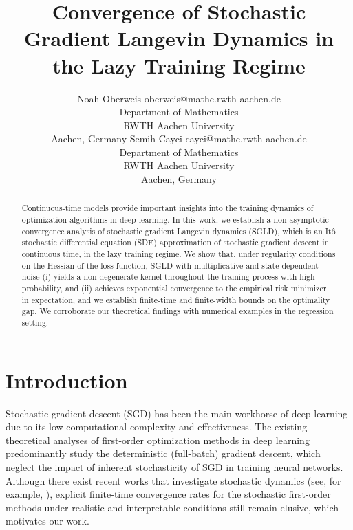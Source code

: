 \documentclass[10pt]{article} %
\title{Convergence of Stochastic Gradient Langevin Dynamics in the Lazy Training Regime}
\author{\name Noah Oberweis \email oberweis@mathc.rwth-aachen.de \\
      \addr Department of Mathematics\\
      RWTH Aachen University\\
      Aachen, Germany
      \AND
      \name Semih Cayci \email cayci@mathc.rwth-aachen.de \\
      \addr Department of Mathematics\\
      RWTH Aachen University\\
      Aachen, Germany
      }
\begin{document}
\maketitle

\begin{abstract}
Continuous-time models provide important insights into the training dynamics of optimization algorithms in deep learning. In this work, we establish a non-asymptotic convergence analysis of stochastic gradient Langevin dynamics (SGLD), which is an Itô stochastic differential equation (SDE) approximation of stochastic gradient descent in continuous time, in the lazy training regime. We show that, under regularity conditions on the Hessian of the loss function, SGLD with multiplicative and state-dependent noise (i) yields a non-degenerate kernel throughout the training process with high probability, and (ii) achieves exponential convergence to the empirical risk minimizer in expectation, and we establish finite-time and finite-width bounds on the optimality gap. We corroborate our theoretical findings with numerical examples in the regression setting.


\end{abstract}
\section{Introduction}
Stochastic gradient descent (SGD) has been the main workhorse of deep learning due to its low computational complexity and effectiveness. 
The existing theoretical analyses of first-order optimization methods in deep learning predominantly study the deterministic (full-batch) gradient descent, which neglect the impact of inherent stochasticity of SGD in training neural networks. Although there exist recent works that investigate stochastic dynamics (see, for example, \cite{lugosi2024convergencecontinuoustimestochasticgradient}), explicit finite-time convergence rates for the stochastic first-order methods under realistic and interpretable conditions still remain elusive, which motivates our work.
\end{document}
